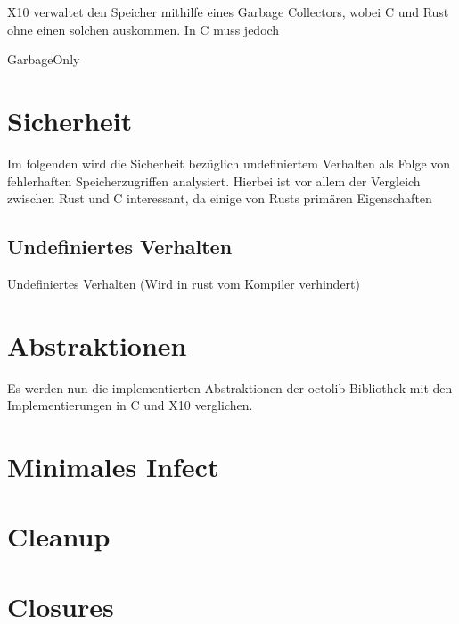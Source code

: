 X10 verwaltet den Speicher mithilfe eines Garbage Collectors, wobei C und Rust ohne einen solchen auskommen.
In C muss jedoch 

GarbageOnly  %


\section{Sicherheit}

Im folgenden wird die Sicherheit bezüglich undefiniertem Verhalten als Folge von fehlerhaften Speicherzugriffen analysiert.
Hierbei ist vor allem der Vergleich zwischen Rust und C interessant, da einige von Rusts primären Eigenschaften 

\subsection{Undefiniertes Verhalten}

Undefiniertes Verhalten (Wird in rust vom Kompiler verhindert)


\section{Abstraktionen}

Es werden nun die implementierten Abstraktionen der octolib Bibliothek mit den Implementierungen in C und X10 verglichen.

\section{Minimales Infect}

\section{Cleanup}

\section{Closures}


